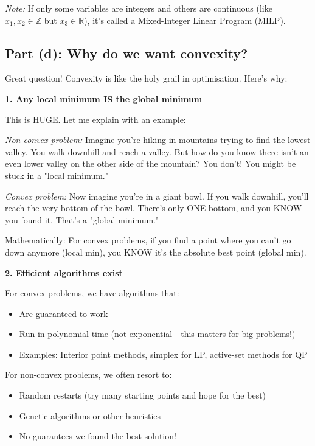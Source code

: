 \documentclass[11pt]{article}
\begin{document}
\textit{Note:} If only some variables are integers and others are continuous (like $x_1, x_2 \in \mathbb{Z}$ but $x_3 \in \mathbb{R}$), it's called a Mixed-Integer Linear Program (MILP).

\subsection{Part (d): Why do we want convexity?}

Great question! Convexity is like the holy grail in optimisation. Here's why:

\vspace{0.5em}

\textbf{1. Any local minimum IS the global minimum}

This is HUGE. Let me explain with an example:

\textit{Non-convex problem:} Imagine you're hiking in mountains trying to find the lowest valley. You walk downhill and reach a valley. But how do you know there isn't an even lower valley on the other side of the mountain? You don't! You might be stuck in a "local minimum."

\textit{Convex problem:} Now imagine you're in a giant bowl. If you walk downhill, you'll reach the very bottom of the bowl. There's only ONE bottom, and you KNOW you found it. That's a "global minimum."

Mathematically: For convex problems, if you find a point where you can't go down anymore (local min), you KNOW it's the absolute best point (global min).

\vspace{0.5em}

\textbf{2. Efficient algorithms exist}

For convex problems, we have algorithms that:
\begin{itemize}
\item Are guaranteed to work
\item Run in polynomial time (not exponential - this matters for big problems!)
\item Examples: Interior point methods, simplex for LP, active-set methods for QP
\end{itemize}

For non-convex problems, we often resort to:
\begin{itemize}
\item Random restarts (try many starting points and hope for the best)
\item Genetic algorithms or other heuristics
\item No guarantees we found the best solution!
\end{itemize}
\end{document}

